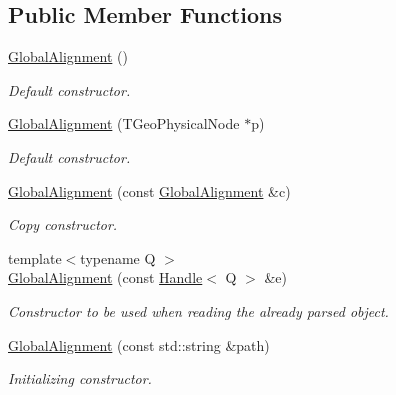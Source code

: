 \subsection*{Public Member Functions}
\begin{DoxyCompactItemize}
\item 
\hyperlink{class_d_d4hep_1_1_alignments_1_1_global_alignment_a022dd4bb7b30b90de999a8d9ed3e7d4a}{GlobalAlignment} ()
\begin{DoxyCompactList}\small\item\em Default constructor. \item\end{DoxyCompactList}\item 
\hyperlink{class_d_d4hep_1_1_alignments_1_1_global_alignment_a49f7dd112c9adddc872156f145ccaf78}{GlobalAlignment} (TGeoPhysicalNode $\ast$p)
\begin{DoxyCompactList}\small\item\em Default constructor. \item\end{DoxyCompactList}\item 
\hyperlink{class_d_d4hep_1_1_alignments_1_1_global_alignment_ac32e57cf2777dd055ace00131dcd8fce}{GlobalAlignment} (const \hyperlink{class_d_d4hep_1_1_alignments_1_1_global_alignment}{GlobalAlignment} \&c)
\begin{DoxyCompactList}\small\item\em Copy constructor. \item\end{DoxyCompactList}\item 
{\footnotesize template$<$typename Q $>$ }\\\hyperlink{class_d_d4hep_1_1_alignments_1_1_global_alignment_a0611b1ce9dcaf5629ceb43b075ee471e}{GlobalAlignment} (const \hyperlink{class_d_d4hep_1_1_handle}{Handle}$<$ Q $>$ \&e)
\begin{DoxyCompactList}\small\item\em Constructor to be used when reading the already parsed object. \item\end{DoxyCompactList}\item 
\hyperlink{class_d_d4hep_1_1_alignments_1_1_global_alignment_a28bf3bee23b8298826ffdfab0c8a94ae}{GlobalAlignment} (const std::string \&path)
\begin{DoxyCompactList}\small\item\em Initializing constructor. \item\end{DoxyCompactList}\item 

\end{DoxyCompactItemize}
